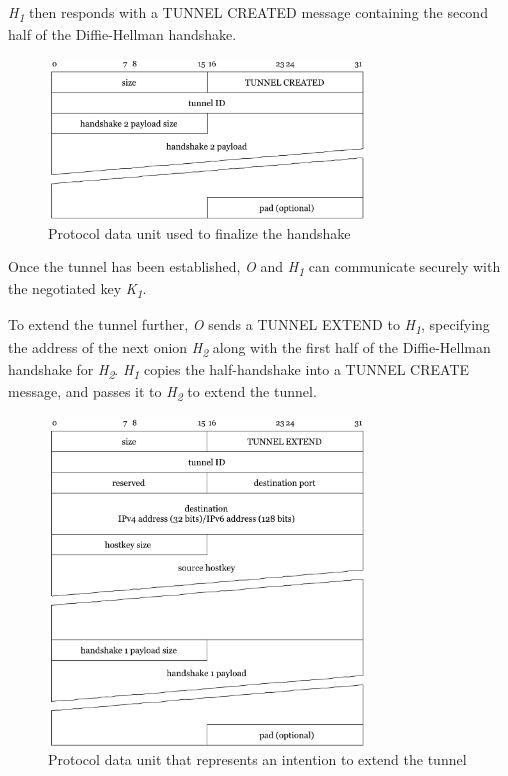 \documentclass{article}
\begin{document}
\textit{H\textsubscript{1}} then responds with a TUNNEL CREATED message containing the second half of the Diffie-Hellman handshake.

\begin{figure}[H]
\centering
     \includegraphics[width=0.75\textwidth]{msg_tunnel_created.pdf}
      \caption{Protocol data unit used to finalize the handshake}
\end{figure}

Once the tunnel has been established, \textit{O} and \textit{H\textsubscript{1}} can communicate securely with the negotiated key \textit{K\textsubscript{1}}.

To extend the tunnel further, \textit{O} sends a TUNNEL EXTEND to \textit{H\textsubscript{1}}, specifying the address of the next onion \textit{H\textsubscript{2}} along with the first half of the Diffie-Hellman handshake for \textit{H\textsubscript{2}}. \textit{H\textsubscript{1}} copies the half-handshake into a TUNNEL CREATE message, and passes it to \textit{H\textsubscript{2}} to extend the tunnel.

\begin{figure}[H]
\centering
     \includegraphics[width=0.75\textwidth]{msg_tunnel_extend.pdf}
      \caption{Protocol data unit that represents an intention to extend the tunnel}
\end{figure}
\end{document}
